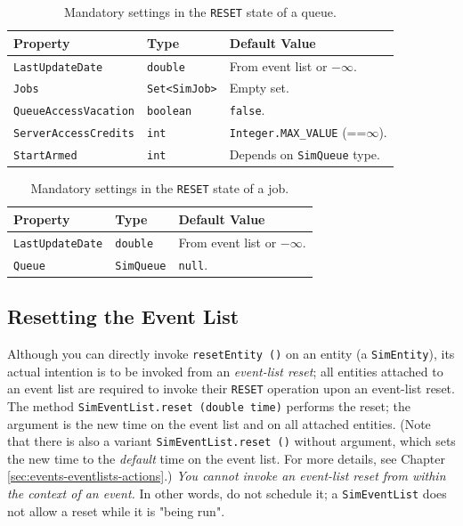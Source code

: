 \documentclass[12pt]{book}
\begin{document}
\begin{table}[h]
\caption{Mandatory settings in the \mbox{\lstinline[basicstyle=\ttfamily]|RESET|} state
  of a queue.}
\label{resetStateSettings-queue}
\begin{tabular}{|l|l|l|}
\hline
Property & Type & Default Value \\ \hline
\lstinline|LastUpdateDate|      & \lstinline|double|      & From event list or $-\infty$.               \\ \hline
\lstinline|Jobs|                & \lstinline|Set<SimJob>| & Empty set.                                  \\ \hline
\lstinline|QueueAccessVacation| & \lstinline|boolean|     & \lstinline|false|.                          \\ \hline
\lstinline|ServerAccessCredits| & \lstinline|int|         & \lstinline|Integer.MAX_VALUE| (==$\infty$). \\ \hline
\lstinline|StartArmed|          & \lstinline|int|         & Depends on \lstinline|SimQueue| type.       \\ \hline
\end{tabular}
\end{table}

\begin{table}[h]
\caption{Mandatory settings in the \mbox{\lstinline[basicstyle=\ttfamily]|RESET|} state
  of a job.}
\label{resetStateSettings-job}
\begin{tabular}{|l|l|l|}
\hline
Property & Type & Default Value \\ \hline
\lstinline|LastUpdateDate|      & \lstinline|double|      & From event list or $-\infty$.               \\ \hline
\lstinline|Queue|               & \lstinline|SimQueue|    & \lstinline|null|.                           \\ \hline
\end{tabular}
\end{table}

\subsection{Resetting the Event List}

Although you can directly invoke \lstinline|resetEntity ()| on an entity
  (a \lstinline|SimEntity|),
  its actual intention is to be invoked from an {\em event-list reset\/};
  all entities attached to an event list are required
  to invoke their \lstinline|RESET| operation upon an event-list reset.
The method \lstinline|SimEventList.reset (double time)| performs
  the reset; the argument is the new time on the event list
  and on all attached entities.
(Note that there is also a variant \lstinline|SimEventList.reset ()|
  without argument, which sets the new time to the {\em default\/} time on the
  event list. For more details, see Chapter \ref{sec:events-eventlists-actions}.)
{\em You cannot invoke an event-list reset from within the context of an event.}
In other words, do not schedule it;
  a \lstinline|SimEventList| does not allow a reset
  while it is "being run".
\end{document}
